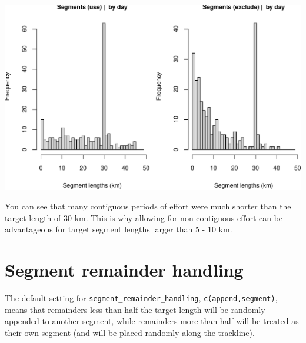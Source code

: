 \documentclass[
]{book}
\newenvironment{Shaded}{\begin{snugshade}}{\end{snugshade}}
\newcommand{\CommentTok}[1]{\textcolor[rgb]{0.56,0.35,0.01}{\textit{#1}}}
\newcommand{\DataTypeTok}[1]{\textcolor[rgb]{0.13,0.29,0.53}{#1}}
\newcommand{\DecValTok}[1]{\textcolor[rgb]{0.00,0.00,0.81}{#1}}
\newcommand{\KeywordTok}[1]{\textcolor[rgb]{0.13,0.29,0.53}{\textbf{#1}}}
\newcommand{\NormalTok}[1]{#1}
\newcommand{\OperatorTok}[1]{\textcolor[rgb]{0.81,0.36,0.00}{\textbf{#1}}}
\newcommand{\OtherTok}[1]{\textcolor[rgb]{0.56,0.35,0.01}{#1}}
\newcommand{\StringTok}[1]{\textcolor[rgb]{0.31,0.60,0.02}{#1}}
\begin{document}
\begin{Shaded}
\end{Shaded}

\includegraphics{figures/unnamed-chunk-64-1.pdf}

You can see that many contiguous periods of effort were much shorter than the target length of 30 km. This is why allowing for non-contiguous effort can be advantageous for target segment lengths larger than 5 - 10 km.

\hypertarget{segment-remainder-handling}{%
\section*{Segment remainder handling}\label{segment-remainder-handling}}

The default setting for \texttt{segment\_remainder\_handling}, \texttt{c(\textquotesingle{}append\textquotesingle{},\textquotesingle{}segment\textquotesingle{})}, means that remainders less than half the target length will be randomly appended to another segment, while remainders more than half will be treated as their own segment (and will be placed randomly along the trackline).
\end{document}
